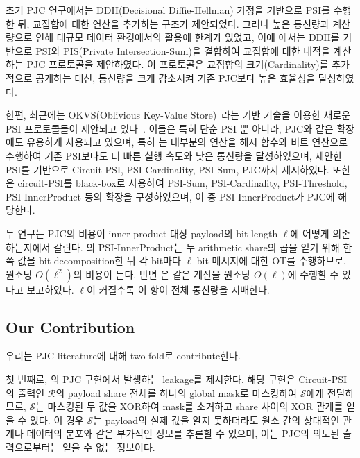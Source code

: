 \documentclass[sigconf,anonymous,review]{acmart}
\begin{document}
초기 PJC 연구에서는 DDH(Decisional Diffie-Hellman) 가정을 기반으로 PSI를 수행한 뒤, 교집합에 대한 연산을 추가하는 구조가 제안되었다. 그러나 높은 통신량과 계산량으로 인해 대규모 데이터 환경에서의 활용에 한계가 있었고, 이에 \cite{CHI+23}에서는 DDH를 기반으로 PSI와 PIS(Private Intersection-Sum)을 결합하여 교집합에 대한 내적을 계산하는 PJC 프로토콜을 제안하였다. 이 프로토콜은 교집합의 크기(Cardinality)를 추가적으로 공개하는 대신, 통신량을 크게 감소시켜 기존 PJC보다 높은 효율성을 달성하였다. 

한편, 최근에는 OKVS(Oblivious Key-Value Store)~\cite{GPR+21}라는 기반 기술을 이용한 새로운 PSI 프로토콜들이 제안되고 있다~\cite{RR22,BPSY23}. 이들은 특히 단순 PSI 뿐 아니라, PJC와 같은 확장에도 유용하게 사용되고 있으며, 특히 \cite{LTS+26}는 대부분의 연산을 해시 함수와 비트 연산으로 수행하여 기존 PSI보다도 더 빠른 실행 속도와 낮은 통신량을 달성하였으며, 제안한 PSI를 기반으로 Circuit-PSI, PSI-Cardinality, PSI-Sum, PJC까지 제시하였다. 
또한 \cite{KLS26}은 circuit-PSI를 black-box로 사용하여 PSI-Sum,
PSI-Cardinality, PSI-Threshold, PSI-InnerProduct 등의 확장을 구성하였으며,
이 중 PSI-InnerProduct가 PJC에 해당한다.

두 연구는 PJC의 비용이 inner product 대상 payload의 bit-length $\ell$에
어떻게 의존하는지에서 갈린다. \cite{KLS26}의 PSI-InnerProduct는 두 arithmetic
share의 곱을 얻기 위해 한쪽 값을 bit decomposition한 뒤 각 bit마다 $\ell$-bit
메시지에 대한 OT를 수행하므로, 원소당 $O(\ell^2)$의 비용이 든다. 반면
\cite{LTS+26}은 같은 계산을 원소당 $O(\ell)$에 수행할 수 있다고 보고하였다.
$\ell$이 커질수록 이 항이 전체 통신량을 지배한다.

\subsection{Our Contribution}\label{sec:contribution}
우리는 PJC literature에 대해 two-fold로 contribute한다.

첫 번째로, \cite{LTS+26}의 PJC 구현에서 발생하는 leakage를 제시한다. 해당 구현은 Circuit-PSI의 출력인 $\mathcal{R}$의 payload share 전체를 하나의 global mask로 마스킹하여 $\mathcal{S}$에게 전달하므로, $\mathcal{S}$는 마스킹된 두 값을 XOR하여 mask를 소거하고 share 사이의 XOR 관계를 얻을 수 있다. 이 경우 $\mathcal{S}$는 payload의 실제 값을 알지 못하더라도 원소 간의 상대적인 관계나 데이터의 분포와 같은 부가적인 정보를 추론할 수 있으며, 이는 PJC의 의도된 출력으로부터는 얻을 수 없는 정보이다.
\end{document}
